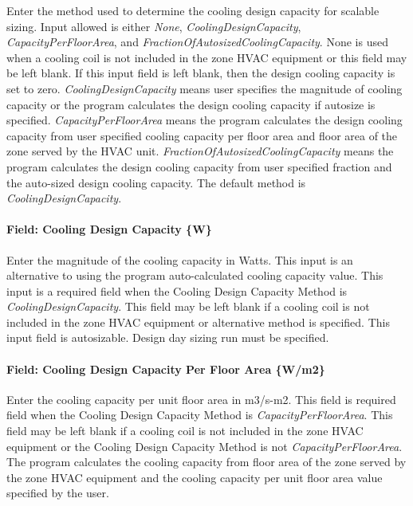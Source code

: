 Enter the method used to determine the cooling design capacity for scalable sizing. Input allowed is either \emph{None}, \emph{CoolingDesignCapacity}, \emph{CapacityPerFloorArea}, and \emph{FractionOfAutosizedCoolingCapacity}. None is used when a cooling coil is not included in the zone HVAC equipment or this field may be left blank. If this input field is left blank, then the design cooling capacity is set to zero. \emph{CoolingDesignCapacity} means user specifies the magnitude of cooling capacity or the program calculates the design cooling capacity if autosize is specified. \emph{CapacityPerFloorArea} means the program calculates the design cooling capacity from user specified cooling capacity per floor area and floor area of the zone served by the HVAC unit. \emph{FractionOfAutosizedCoolingCapacity} means the program calculates the design cooling capacity from user specified fraction and the auto-sized design cooling capacity. The default method is \emph{CoolingDesignCapacity}.

\paragraph{Field: Cooling Design Capacity \{W\}}\label{field-cooling-design-capacity-w}

Enter the magnitude of the cooling capacity in Watts. This input is an alternative to using the program auto-calculated cooling capacity value. This input is a required field when the Cooling Design Capacity Method is \emph{CoolingDesignCapacity}. This field may be left blank if a cooling coil is not included in the zone HVAC equipment or alternative method is specified. This input field is autosizable. Design day sizing run must be specified.

\paragraph{Field: Cooling Design Capacity Per Floor Area \{W/m2\}}\label{field-cooling-design-capacity-per-floor-area-wm2}

Enter the cooling capacity per unit floor area in m3/s-m2. This field is required field when the Cooling Design Capacity Method is \emph{CapacityPerFloorArea}. This field may be left blank if a cooling coil is not included in the zone HVAC equipment or the Cooling Design Capacity Method is not \emph{CapacityPerFloorArea}. The program calculates the cooling capacity from floor area of the zone served by the zone HVAC equipment and the cooling capacity per unit floor area value specified by the user.

